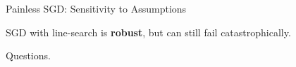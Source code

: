 \documentclass[notheorems]{beamer}
\begin{document}
    \begin{frame}{Painless SGD: Sensitivity to Assumptions}

        SGD with line-search is \textbf{robust}, but can still fail catastrophically.

        \begin{figure}
        \end{figure}

    \end{frame}


    \begin{frame}{}
        \begin{center}
        \huge Questions.
        \end{center}
    \end{frame}
\end{document}

